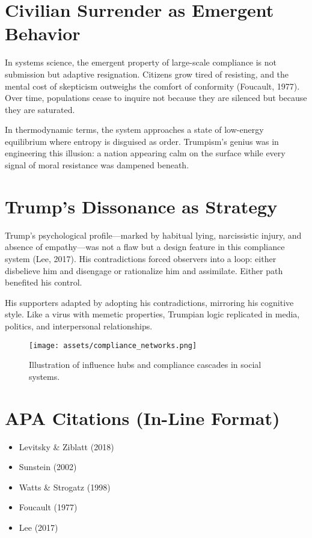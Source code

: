 \documentclass[
]{article}
\providecommand{\tightlist}{%
  \setlength{\itemsep}{0pt}\setlength{\parskip}{0pt}}
\begin{document}
\section*{Civilian Surrender as Emergent Behavior}

In systems science, the emergent property of large-scale compliance is not submission but adaptive resignation. Citizens grow tired of resisting, and the mental cost of skepticism outweighs the comfort of conformity (Foucault, 1977). Over time, populations cease to inquire not because they are silenced but because they are saturated.

In thermodynamic terms, the system approaches a state of low-energy equilibrium where entropy is disguised as order. Trumpism's genius was in engineering this illusion: a nation appearing calm on the surface while every signal of moral resistance was dampened beneath.

\section*{Trump’s Dissonance as Strategy}

Trump's psychological profile---marked by habitual lying, narcissistic injury, and absence of empathy---was not a flaw but a design feature in this compliance system (Lee, 2017). His contradictions forced observers into a loop: either disbelieve him and disengage or rationalize him and assimilate. Either path benefited his control.

His supporters adapted by adopting his contradictions, mirroring his cognitive style. Like a virus with memetic properties, Trumpian logic replicated in media, politics, and interpersonal relationships.

\begin{figure}[H]
\centering
\texttt{[image: assets/compliance\_networks.png]}
\caption{Illustration of influence hubs and compliance cascades in social systems.}
\label{fig:compliance_networks}
\end{figure}

\section*{APA Citations (In-Line Format)}

\begin{itemize}
\tightlist
\item
  Levitsky \& Ziblatt (2018)\\
\item
  Sunstein (2002)\\
\item
  Watts \& Strogatz (1998)\\
\item
  Foucault (1977)\\
\item
  Lee (2017)
\end{itemize}
\end{document}
